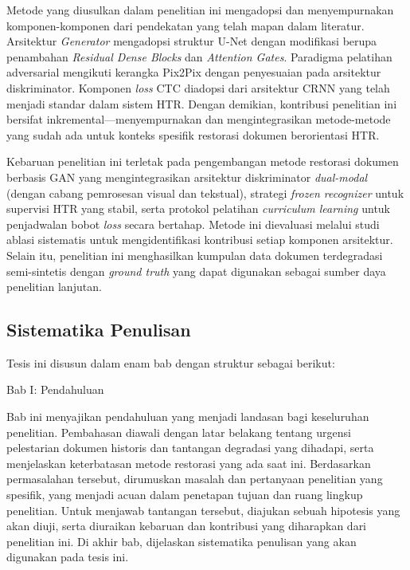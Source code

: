 Metode yang diusulkan dalam penelitian ini mengadopsi dan menyempurnakan komponen-komponen dari pendekatan yang telah mapan dalam literatur. Arsitektur \textit{Generator} mengadopsi struktur U-Net \parencite{ronneberger2015} dengan modifikasi berupa penambahan \textit{Residual Dense Blocks} dan \textit{Attention Gates}. Paradigma pelatihan adversarial mengikuti kerangka Pix2Pix \parencite{isola2017} dengan penyesuaian pada arsitektur diskriminator. Komponen \textit{loss} CTC diadopsi dari arsitektur CRNN \parencite{shi2016} yang telah menjadi standar dalam sistem HTR. Dengan demikian, kontribusi penelitian ini bersifat inkremental---menyempurnakan dan mengintegrasikan metode-metode yang sudah ada untuk konteks spesifik restorasi dokumen berorientasi HTR.

Kebaruan penelitian ini terletak pada pengembangan metode restorasi dokumen berbasis GAN yang mengintegrasikan arsitektur diskriminator \textit{dual-modal} (dengan cabang pemrosesan visual dan tekstual), strategi \textit{frozen recognizer} untuk supervisi HTR yang stabil, serta protokol pelatihan \textit{curriculum learning} untuk penjadwalan bobot \textit{loss} secara bertahap. Metode ini dievaluasi melalui studi ablasi sistematis untuk mengidentifikasi kontribusi setiap komponen arsitektur. Selain itu, penelitian ini menghasilkan kumpulan data dokumen terdegradasi semi-sintetis dengan \textit{ground truth} yang dapat digunakan sebagai sumber daya penelitian lanjutan.


\subsection{Sistematika Penulisan}
\label{subsec:sistematika}

Tesis ini disusun dalam enam bab dengan struktur sebagai berikut:


Bab I: Pendahuluan

Bab ini menyajikan pendahuluan yang menjadi landasan bagi keseluruhan penelitian. Pembahasan diawali dengan latar belakang tentang urgensi pelestarian dokumen historis dan tantangan degradasi yang dihadapi, serta menjelaskan keterbatasan metode restorasi yang ada saat ini. Berdasarkan permasalahan tersebut, dirumuskan masalah dan pertanyaan penelitian yang spesifik, yang menjadi acuan dalam penetapan tujuan dan ruang lingkup penelitian. Untuk menjawab tantangan tersebut, diajukan sebuah hipotesis yang akan diuji, serta diuraikan kebaruan dan kontribusi yang diharapkan dari penelitian ini. Di akhir bab, dijelaskan sistematika penulisan yang akan digunakan pada tesis ini.


